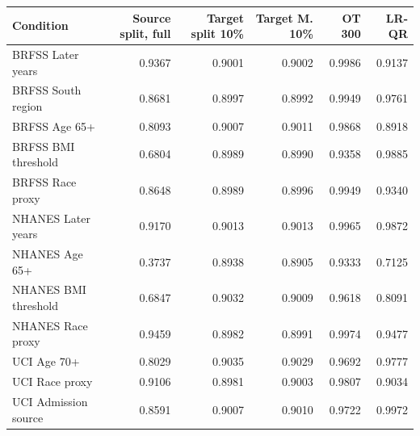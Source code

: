 \begin{tabular}{lrrrrr}
\toprule
Condition & Source split, full & Target split 10\% & Target M. 10\% & OT 300 & LR-QR \\
\midrule
BRFSS Later years & 0.9367 & 0.9001 & 0.9002 & 0.9986 & 0.9137 \\
BRFSS South region & 0.8681 & 0.8997 & 0.8992 & 0.9949 & 0.9761 \\
BRFSS Age 65+ & 0.8093 & 0.9007 & 0.9011 & 0.9868 & 0.8918 \\
BRFSS BMI threshold & 0.6804 & 0.8989 & 0.8990 & 0.9358 & 0.9885 \\
BRFSS Race proxy & 0.8648 & 0.8989 & 0.8996 & 0.9949 & 0.9340 \\
NHANES Later years & 0.9170 & 0.9013 & 0.9013 & 0.9965 & 0.9872 \\
NHANES Age 65+ & 0.3737 & 0.8938 & 0.8905 & 0.9333 & 0.7125 \\
NHANES BMI threshold & 0.6847 & 0.9032 & 0.9009 & 0.9618 & 0.8091 \\
NHANES Race proxy & 0.9459 & 0.8982 & 0.8991 & 0.9974 & 0.9477 \\
UCI Age 70+ & 0.8029 & 0.9035 & 0.9029 & 0.9692 & 0.9777 \\
UCI Race proxy & 0.9106 & 0.8981 & 0.9003 & 0.9807 & 0.9034 \\
UCI Admission source & 0.8591 & 0.9007 & 0.9010 & 0.9722 & 0.9972 \\
\bottomrule
\end{tabular}
